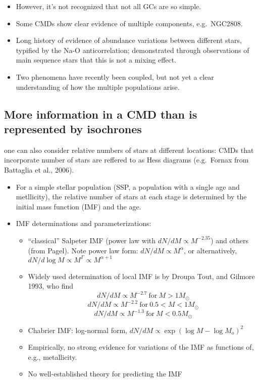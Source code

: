 \documentclass{article}
\begin{document}
      \begin{itemize}
          \item However, it's not recognized that not all GCs are so simple.
          \item Some CMDs show clear evidence of multiple components, e.g.\
              {NGC2808}.
          \item Long history of evidence of abundance variations between
              different stars, typified by the Na-O anticorrelation;
              demonstrated through observations of main sequence stars that
              this is not a mixing effect.
          \item Two phenomena have recently been coupled, but not yet a clear
              understanding of how the multiple populations arise.
      \end{itemize}

\subsection{More information in a CMD than is represented by isochrones}
  one can also consider relative numbers of stars at
      different locations: CMDs that incorporate number of stars are
      reffered to as Hess diagrams (e.g.\ {Fornax}
      from Battaglia et al., 2006).
      \begin{itemize}
          \item For a simple stellar population (SSP, a population with
              a single age and metllicity), the relative number of stars
              at each stage is determined by the initial mass function (IMF)
              and the age.
          \item IMF determinations and parameterizations:
              \begin{itemize}
                  \item ``classical'' Salpeter IMF (power law with
                      $ dN/dM \propto M^{-2.35}$) and {others}
                      (from {Pagel}). Note power law form:
                      $ dN/dM \propto M^{\alpha}  $,
                      or alternatively,
                      $ dN/d\log{M} \propto M^{\Gamma} \propto M^{\alpha + 1} $
                  \item Widely used determination of local IMF is by
                      {Droupa Tout, and Gilmore 1993}, who find
                      $$ dN/dM \propto M^{-2.7}\ \textrm{for}\ M > 1M_{\odot} $$
                      $$ dN/dM \propto M^{-2.2}\ \textrm{for}\ 0.5 < M < 1M_{\odot} $$
                      $$ dN/dM \propto M^{-1.3}\ \textrm{for}\ M < 0.5M_{\odot} $$
                  \item Chabrier IMF: log-normal form,
                      $ dN/dM \propto \exp(\log{M}-\log{M_o})^2  $
                  \item Empirically, no strong evidence for variations of the
                    IMF as functions of, e.g., metallicity.
                  \item No well-established theory for predicting the IMF
              \end{itemize}
      \end{itemize}
\end{document}
